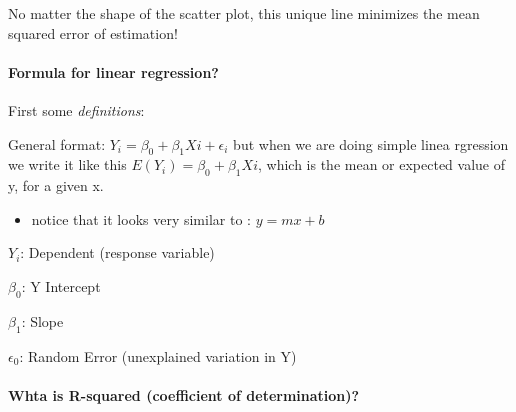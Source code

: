 \documentclass[11pt]{article}
\providecommand{\tightlist}{%
      \setlength{\itemsep}{0pt}\setlength{\parskip}{0pt}}
\begin{document}
No matter the shape of the scatter plot, this unique line minimizes the
mean squared error of estimation!

    \paragraph{Formula for linear
regression?}\label{formula-for-linear-regression}

First some \emph{definitions}:

General format: \(Y_i =\beta_0 +\beta_1Xi+\epsilon_i\) but when we are
doing simple linea rgression we write it like this
\(E(Y_i) =\beta_0 +\beta_1Xi\), which is the mean or expected value of
y, for a given x.

\begin{itemize}
\tightlist
\item
  notice that it looks very similar to : \(y=mx +b\)
\end{itemize}

\(Y_i\): Dependent (response variable)

\(\beta_0\): Y Intercept

\(\beta_1\): Slope

\(\epsilon_0\): Random Error (unexplained variation in Y)

    \paragraph{Whta is R-squared (coefficient of
determination)?}\label{whta-is-r-squared-coefficient-of-determination}
\end{document}
